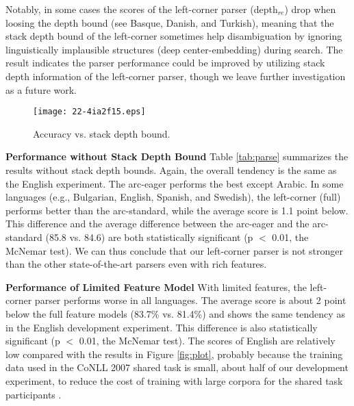 \documentclass[english]{jnlp_1.4}
\begin{document}
Notably, in some cases the scores of the left-corner parser (depth$_{re}$) drop when loosing the depth bound (see Basque, Danish, and Turkish), meaning that the stack depth bound of the left-corner sometimes help disambiguation by ignoring linguistically implausible structures (deep center-embedding) during search.
The result indicates the parser performance could be improved by utilizing stack depth information of the left-corner parser, though we leave further investigation as a future work.

\begin{figure}[p]
\begin{center}
\texttt{[image: 22-4ia2f15.eps]}
\end{center}
\caption{Accuracy vs. stack depth bound.}
\label{fig:conll_depth_to_accuracy}
\end{figure}

    \noindent\textbf{Performance without Stack Depth Bound}
Table \ref{tab:parse} summarizes the results without stack depth bounds.
Again, the overall tendency is the same as the English experiment.
The arc-eager performs the best except Arabic.
In some languages (e.g., Bulgarian, English, Spanish, and Swedish), the left-corner (full) performs better than the arc-standard, while the average score is 1.1 point below.
This difference and the average difference between the arc-eager and the arc-standard (85.8 vs. 84.6) are both statistically significant (p $<$ 0.01, the McNemar test).
We can thus conclude that our left-corner parser is not stronger than the other state-of-the-art parsers even with rich features.

\begin{table}[t]
\label{tab:parse}

\end{table}

    \noindent\textbf{Performance of Limited Feature Model}
With limited features, the left-corner parser performs worse in all languages. The average score is about 2 point below the full feature models (83.7\% vs. 81.4\%) and shows the same tendency as in the English development experiment.
This difference is also statistically significant (p $<$ 0.01, the McNemar test).
The scores of English are relatively low compared with the results in Figure \ref{fig:plot}, probably because the training data used in the CoNLL 2007 shared task is small, about half of our development experiment, to reduce the cost of training with large corpora for the shared task participants \cite{nivre-EtAl:2007:EMNLP-CoNLL2007}.
\end{document}
